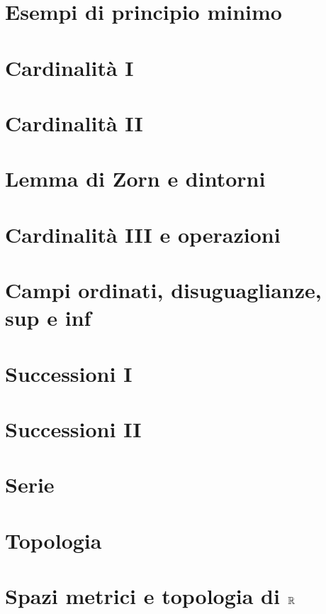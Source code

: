 \documentclass[a4paper]{article}
\begin{document}
\section{Esempi di principio minimo}


\section{Cardinalità I}


\section{Cardinalità II}


\section{Lemma di Zorn e dintorni}


\section{Cardinalità III e operazioni}


\section{Campi ordinati, disuguaglianze, sup e inf}


\section{Successioni I}


\section{Successioni II}


\section{Serie}


\section{Topologia}


\section{Spazi metrici e topologia di $ \mathbb{R} $}

\end{document}
